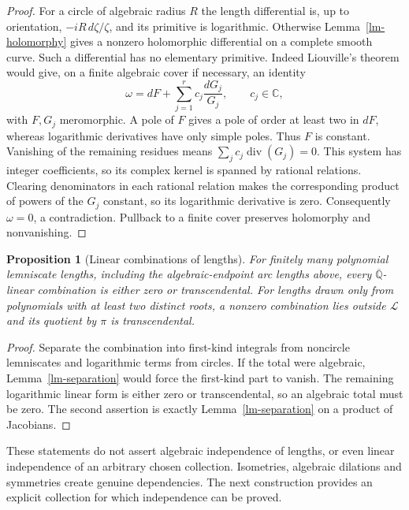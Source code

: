 \documentclass[11pt,a4paper]{article}
\newtheorem{proposition}[theorem]{Proposition}
\theoremstyle{definition}
\theoremstyle{remark}
\numberwithin{equation}{section}
\newcommand{\Qbar}{\overline{\mathbb Q}}
\begin{document}
\begin{proof}
For a circle of algebraic radius $R$ the length differential is, up to
orientation, $-iR\,d\zeta/\zeta$, and its primitive is logarithmic.
Otherwise Lemma~\ref{lm-holomorphy} gives a nonzero holomorphic
differential on a complete smooth curve.  Such a differential has no
elementary primitive.  Indeed Liouville's theorem \cite{lm-Rosenlicht}
would give, on a finite algebraic cover if necessary, an identity
\[
 \omega=dF+\sum_{j=1}^r c_j\frac{dG_j}{G_j},
 \qquad c_j\in\mathbb C,
\]
with $F,G_j$ meromorphic.  A pole of $F$ gives a pole of order at least
two in $dF$, whereas logarithmic derivatives have only simple poles.
Thus $F$ is constant.  Vanishing of the remaining residues means
$\sum_j c_j\operatorname{div}(G_j)=0$.  This system has integer
coefficients, so its complex kernel is spanned by rational relations.
Clearing denominators in each rational relation makes the corresponding
product of powers of the $G_j$ constant, so its logarithmic derivative
is zero.  Consequently $\omega=0$, a contradiction.  Pullback to a
finite cover preserves holomorphy and nonvanishing.
\end{proof}

\begin{proposition}[Linear combinations of lengths]\label{lm-linear-combinations}
For finitely many polynomial lemniscate lengths, including the
algebraic-endpoint arc lengths above, every $\Qbar$-linear combination is
either zero or transcendental.  For lengths drawn only from polynomials
with at least two distinct roots, a nonzero combination lies outside
$\mathcal L$ and its quotient by $\pi$ is transcendental.
\end{proposition}

\begin{proof}
Separate the combination into first-kind integrals from noncircle
lemniscates and logarithmic terms from circles.  If the total were
algebraic, Lemma~\ref{lm-separation} would force the first-kind part to
vanish.  The remaining logarithmic linear form is either zero or
transcendental, so an algebraic total must be zero.  The second assertion
is exactly Lemma~\ref{lm-separation} on a product of Jacobians.
\end{proof}

These statements do not assert algebraic independence of lengths, or even
linear independence of an arbitrary chosen collection.  Isometries,
algebraic dilations and symmetries create genuine dependencies.  The next
construction provides an explicit collection for which independence can
be proved.
\end{document}
